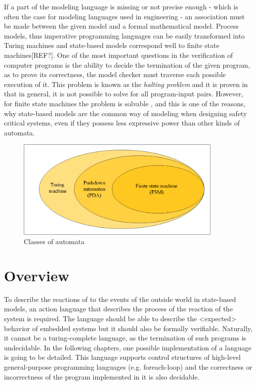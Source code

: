 If a part of the modeling language is missing or not precise enough - which is often the case for modeling languages used in engineering - an association must be made between the given model and a formal mathematical model. Process models, thus imperative programming languages can be easily transformed into Turing machines and state-based models correspond well to finite state machines[REF?]. One of the most important questions in the verification of computer programs is the ability to decide the termination of the given program, as to prove its correctness, the model checker must traverse each possible execution of it. This problem is known as the \textit{halting problem} and it is proven in \cite{Turing1936} that in general, it is not possible to solve for all program-input pairs. However, for finite state machines the problem is solvable \cite{Minsky:1967}, and this is one of the reasons, why state-based models are the common way of modeling when designing safety critical systems, even if they possess less expressive power than other kinds of automata. 

\begin{figure}[!ht]
	\centering
	\includegraphics[width=100mm, keepaspectratio]{figures/automataTheory.png}
	\caption{Classes of automata}
	\label{fig:automataTheory}
\end{figure}

\section{Overview} \label{Overview_section}
To describe the reactions of to the events of the outside world in state-based models, an action language that describes the process of the reaction of the system is required. The language should be able to describe the <expected> behavior of embedded systems but it should also be formally verifiable. Naturally, it cannot be a turing-complete language, as the termination of such programs is undecidable. In the following chapters, one possible implementation of a language is going to be detailed. This language supports control structures of high-level general-purpose programming languages (e.g. foreach-loop) and the correctness or incorrectness of the program implemented in it is also decidable. 

